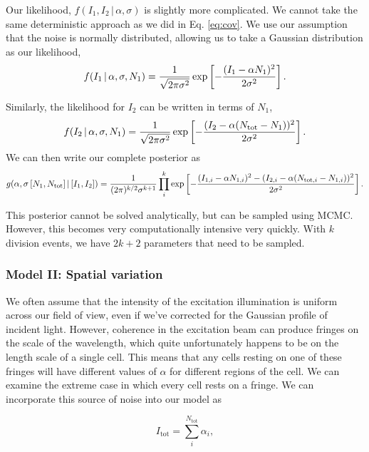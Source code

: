 Our likelihood, $f(I_1, I_2\, \vert\, \alpha, \sigma)$ is slightly more complicated.
We cannot take the same deterministic approach as we did in Eq. \ref{eq:cov}.
We use our assumption that the noise is normally distributed, allowing us
to take a Gaussian distribution as our likelihood,
\begin{equation}
  f(I_1\,\vert \, \alpha, \sigma, N_1)= {1 \over \sqrt{2\pi\sigma^2}}\exp\left[-{(I_1 - \alpha N_1)^2 \over 2\sigma^2}\right].
  \label{eq:model1_like_i1}
\end{equation}

Similarly, the likelihood for $I_2$ can be written in terms of $N_1$,
\begin{equation}
  f(I_2\,\vert\, \alpha, \sigma, N_1) = {1 \over \sqrt{2\pi\sigma^2}}\exp\left[-{(I_2 - \alpha (N_\text{tot} - N_1))^2 \over 2\sigma^2}\right].
\end{equation}
We can then write our complete posterior as
\begin{equation}
  g(\alpha, \sigma\, [N_1, N_\text{tot}]\, \vert\, [I_1, I_2]) = {1\over
  (2\pi)^{k/2}\sigma^{k+1}}
  \prod\limits_i^k\exp\left[-{(I_{1,i} - \alpha
  N_{1,i})^2 - (I_{2,i} - \alpha(N_{\text{tot},i} - N_{1,i}))^2 \over
  2\sigma^2}\right].
  \label{eq:model1_post}
\end{equation}

This posterior cannot be solved analytically, but can be sampled using MCMC. However, this becomes
very computationally intensive very quickly. With $k$ division events, we have $2k + 2$ parameters
that need to be sampled.


\subsubsection*{Model II: Spatial variation}
We often assume that the intensity of the excitation illumination is uniform across our field of
view, even if we've corrected for the Gaussian profile of incident light. However, coherence in
the excitation beam can produce fringes on the scale of the wavelength, which quite unfortunately
happens to be on the length scale of a single cell. This means that any cells resting on one of
these fringes will have different values of $\alpha$ for different regions of the cell. We can
examine the extreme case in which every cell rests on a fringe. We can incorporate this source
of noise into our model as

\begin{equation}
  I_\text{tot} = \sum\limits_i^{N_\text{tot}} \alpha_i,
\end{equation}

